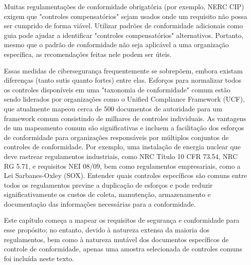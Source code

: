 Muitas regulamentações de conformidade obrigatória (por exemplo, NERC CIP) exigem que "controles compensatórios" sejam usados onde um requisito não possa ser cumprido de forma viável. Utilizar padrões de conformidade adicionais como guia pode ajudar a identificar "controles compensatórios" alternativos. Portanto, mesmo que o padrão de conformidade não seja aplicável a uma organização específica, as recomendações feitas nele podem ser úteis.

Essas medidas de cibersegurança frequentemente se sobrepõem, embora existam diferenças (tanto sutis quanto fortes) entre elas. Esforços para normalizar todos os controles disponíveis em uma "taxonomia de conformidade" comum estão sendo liderados por organizações como o Unified Compliance Framework (UCF), que atualmente mapeou cerca de 500 documentos de autoridade para um framework comum consistindo de milhares de controles individuais. As vantagens de um mapeamento comum são significativas e incluem a facilitação dos esforços de conformidade para organizações responsáveis por múltiplos conjuntos de controles de conformidade. Por exemplo, uma instalação de energia nuclear que deve rastrear regulamentos industriais, como NRC Título 10 CFR 73.54, NRC RG 5.71, e requisitos NEI 08/09, bem como regulamentos empresariais, como a Lei Sarbanes-Oxley (SOX). Entender quais controles específicos são comuns entre todos os regulamentos previne a duplicação de esforços e pode reduzir significativamente os custos de coleta, manutenção, armazenamento e documentação das informações necessárias para a conformidade.

Este capítulo começa a mapear os requisitos de segurança e conformidade para esse propósito; no entanto, devido à natureza extensa da maioria dos regulamentos, bem como à natureza mutável dos documentos específicos de controle de conformidade, apenas uma amostra selecionada de controles comuns foi incluída neste texto.




